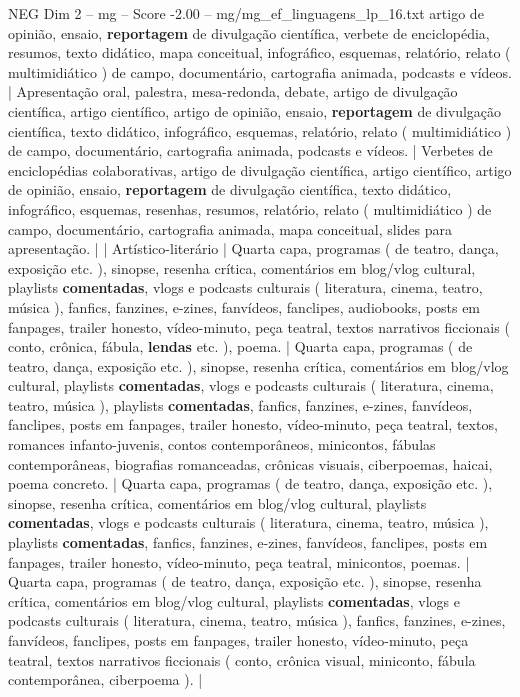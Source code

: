 \begin{textsample}{NEG Dim 2 – mg – Score -2.00 – mg/mg\_ef\_linguagens\_lp\_16.txt}
artigo de opinião, ensaio, \textbf{reportagem} de divulgação científica, verbete de enciclopédia, resumos, texto didático, mapa conceitual, infográfico, esquemas, relatório, relato ( multimidiático ) de campo, documentário, cartografia animada, podcasts e vídeos. | Apresentação oral, palestra, mesa-redonda, debate, artigo de divulgação científica, artigo científico, artigo de opinião, ensaio, \textbf{reportagem} de divulgação científica, texto didático, infográfico, esquemas, relatório, relato ( multimidiático ) de campo, documentário, cartografia animada, podcasts e vídeos. | Verbetes de enciclopédias colaborativas, artigo de divulgação científica, artigo científico, artigo de opinião, ensaio, \textbf{reportagem} de divulgação científica, texto didático, infográfico, esquemas, resenhas, resumos, relatório, relato ( multimidiático ) de campo, documentário, cartografia animada, mapa conceitual, slides para apresentação. | | Artístico-literário | Quarta capa, programas ( de teatro, dança, exposição etc. ), sinopse, resenha crítica, comentários em blog/vlog cultural, playlists \textbf{comentadas}, vlogs e podcasts culturais ( literatura, cinema, teatro, música ), fanfics, fanzines, e-zines, fanvídeos, fanclipes, audiobooks, posts em fanpages, trailer honesto, vídeo-minuto, peça teatral, textos narrativos ficcionais ( conto, crônica, fábula, \textbf{lendas} etc. ), poema. | Quarta capa, programas ( de teatro, dança, exposição etc. ), sinopse, resenha crítica, comentários em blog/vlog cultural, playlists \textbf{comentadas}, vlogs e podcasts culturais ( literatura, cinema, teatro, música ), playlists \textbf{comentadas}, fanfics, fanzines, e-zines, fanvídeos, fanclipes, posts em fanpages, trailer honesto, vídeo-minuto, peça teatral, textos, romances infanto-juvenis, contos contemporâneos, minicontos, fábulas contemporâneas, biografias romanceadas, crônicas visuais, ciberpoemas, haicai, poema concreto. | Quarta capa, programas ( de teatro, dança, exposição etc. ), sinopse, resenha crítica, comentários em blog/vlog cultural, playlists \textbf{comentadas}, vlogs e podcasts culturais ( literatura, cinema, teatro, música ), playlists \textbf{comentadas}, fanfics, fanzines, e-zines, fanvídeos, fanclipes, posts em fanpages, trailer honesto, vídeo-minuto, peça teatral, minicontos, poemas. | Quarta capa, programas ( de teatro, dança, exposição etc. ), sinopse, resenha crítica, comentários em blog/vlog cultural, playlists \textbf{comentadas}, vlogs e podcasts culturais ( literatura, cinema, teatro, música ), fanfics, fanzines, e-zines, fanvídeos, fanclipes, posts em fanpages, trailer honesto, vídeo-minuto, peça teatral, textos narrativos ficcionais ( conto, crônica visual, miniconto, fábula contemporânea, ciberpoema ). |

\end{textsample}
